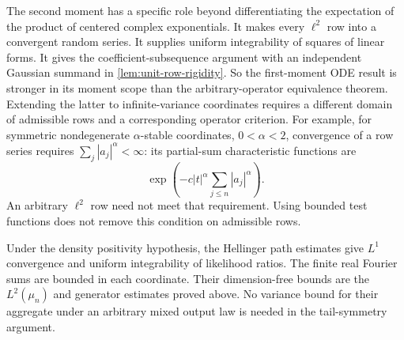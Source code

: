 The second moment has a specific role beyond differentiating the expectation
of the product of centered complex exponentials.
It makes every \(\ell^2\) row into a convergent random series.
It supplies uniform integrability of squares of linear forms.
It gives the coefficient-subsequence argument with an independent Gaussian
summand in \cref{lem:unit-row-rigidity}.
So the first-moment ODE result is stronger in its moment scope than the
arbitrary-operator equivalence theorem.
Extending the latter to infinite-variance coordinates requires a different
domain of admissible rows and a corresponding operator criterion.
For example, for symmetric nondegenerate \(\alpha\)-stable coordinates,
\(0<\alpha<2\), convergence of a row series requires
$\sum_j|a_j|^\alpha<\infty$: its partial-sum characteristic
functions are
\[
 \exp\left(-c|t|^\alpha\sum_{j\le n}|a_j|^\alpha\right).
\]
An arbitrary \(\ell^2\) row need not meet that requirement.
Using bounded test functions does not remove this condition on admissible rows.

Under the density positivity hypothesis, the Hellinger path estimates give $L^1$ convergence and uniform
integrability of likelihood ratios.
The finite real Fourier sums are bounded in each coordinate.
Their dimension-free bounds are the $L^2(\mu_n)$ and generator
estimates proved above.
No variance bound for their aggregate under an arbitrary mixed output law is
needed in the tail-symmetry argument.
